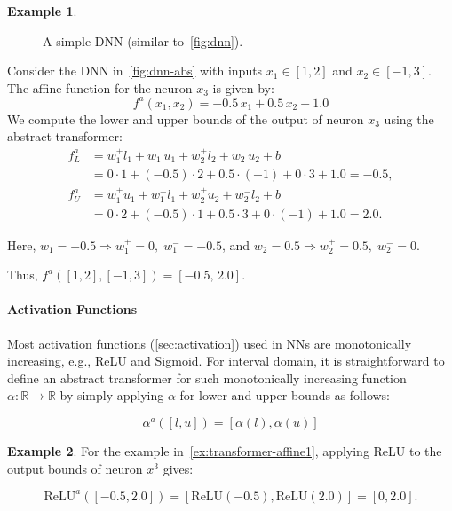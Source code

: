 \documentclass[oneside,11pt,dvipsnames]{book}
\numberwithin{equation}{section}
\theoremstyle{definition}
\newtheorem{example}{Example}[section]
\theoremstyle{remark}
\newcommand{\myrelu}{\mathrm{ReLU}}
\begin{document}
\begin{example}\label{ex:transformer-affine1}

\begin{figure}
\centering
\mydnn
\caption{\label{fig:dnn-abs}A simple DNN (similar to~\autoref{fig:dnn}).}
\end{figure}    

Consider the DNN in~\autoref{fig:dnn-abs} with inputs \(x_1 \in [1, 2]\) and \(x_2 \in [-1, 3]\). The affine function for the neuron \(x_3\) is given by:
\[
f^a(x_1,x_2) = -0.5\,x_1 + 0.5\,x_2 + 1.0
\]
We compute the lower and upper bounds of the output of neuron $x_3$ using the abstract transformer:
\[\begin{aligned}
f^a_L &= w_1^{+} l_1 + w_1^{-} u_1 + w_2^{+} l_2 + w_2^{-} u_2 + b \\
    &= 0\cdot 1 + (-0.5)\cdot 2 + 0.5\cdot(-1) + 0\cdot 3 + 1.0 = -0.5,\\
f^a_U &= w_1^{+} u_1 + w_1^{-} l_1 + w_2^{+} u_2 + w_2^{-} l_2 + b \\
    &= 0\cdot 2 + (-0.5)\cdot 1 + 0.5\cdot 3 + 0\cdot(-1) + 1.0 = 2.0.
\end{aligned}\]

Here, \(w_1=-0.5\Rightarrow w_1^{+}=0,\; w_1^{-}=-0.5\), and \(w_2=0.5\Rightarrow w_2^{+}=0.5,\; w_2^{-}=0\).

Thus, \(f^a([1,2],[-1,3]) = [-0.5,\, 2.0].\)
\end{example}

\paragraph{Activation Functions}

Most activation functions (\autoref{sec:activation}) used in NNs are monotonically increasing, e.g., ReLU and Sigmoid. For interval domain, it is straightforward to define an abstract transformer for such monotonically increasing function \(\alpha : \mathbb{R} \to \mathbb{R}\) by simply applying $\alpha$ for lower and upper bounds as follows:

\[
\alpha^a([l, u]) = [ \alpha(l), \alpha(u)]
\]

\begin{example}
For the example in~\autoref{ex:transformer-affine1}, applying ReLU to the output bounds of neuron $x^3$ gives:

\[
\myrelu^a([-0.5, 2.0]) = [\myrelu(-0.5), \myrelu(2.0)] 
= [0, 2.0].
\]
\end{example}
\end{document}
